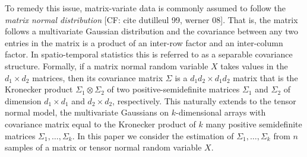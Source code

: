 \documentclass{article}
\newcommand{\ot}{\otimes}
\newcommand{\CF}[1]{{\color{purple}[CF: #1]}}
\begin{document}
To remedy this issue, matrix-variate data is commonly assumed to follow the \emph{matrix normal distribution} \CF{cite dutilleul 99, werner 08}. That is, the matrix follows a multivariate Gaussian distribution and the covariance between any two entries in the matrix is a product of an inter-row factor and an inter-column factor. In spatio-temporal statistics this is referred to as a separable covariance structure. Formally, if a matrix normal random variable $X$ takes values in the $d_1\times d_2$ matrices, then its covariance matrix $\Sigma$ is a $d_1d_2\times d_1 d_2$ matrix that is the Kronecker product $\Sigma_1 \ot \Sigma_2$ of two positive-semidefinite matrices $\Sigma_1$ and $\Sigma_2$ of dimension $d_1\times d_1$ and $d_2\times d_2$, respectively. This naturally extends to the tensor normal model, the multivariate Gaussians on $k$-dimensional arrays with covariance matrix equal to the Kronecker product of $k$ many positive semidefinite matrices $\Sigma_1, \dots, \Sigma_k$. In this paper we consider the estimation of $\Sigma_1, \dots, \Sigma_k$ from $n$ samples of a matrix or tensor normal random variable $X$. 
\end{document}
